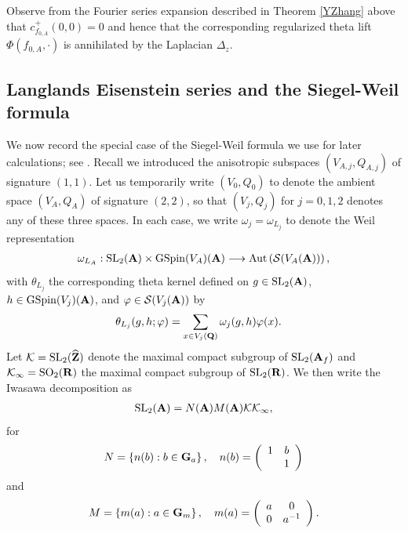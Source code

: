 \documentclass{amsart}
\theoremstyle{definition}
\begin{document}
Observe from the Fourier series expansion described in Theorem \ref{YZhang} above that $c^+_{f_{0, A}}(0,0)=0$
and hence that the corresponding regularized theta lift $\Phi( f_{0, A}, \cdot )$ is annihilated by the Laplacian $\Delta_z$. 

\subsection{Langlands Eisenstein series and the Siegel-Weil formula}

We now record the special case of the Siegel-Weil formula we use for later calculations; see \cite[Theorem 4.1]{KuBL}. 
Recall we introduced the anisotropic subspaces $(V_{A, j}, Q_{A, j})$ of signature $(1,1)$.
Let us temporarily write $(V_0, Q_0)$ to denote the ambient space $(V_A, Q_A)$ of signature $(2, 2)$, so that $(V_j, Q_j)$ for $j=0,1,2$ denotes any of these three spaces. 
In each case, we write $\omega_{j} = \omega_{L_j}$ to denote the Weil representation 
\begin{align*} \omega_{L_A}: \operatorname{SL}_2({\bf{A}}) \times \operatorname{GSpin}(V_A)({\bf{A}}) \longrightarrow \operatorname{Aut} \left(  \mathcal{S}(V_A({\bf{A}})) \right), \end{align*}
with $\theta_{L_j}$ the corresponding theta kernel defined on $g \in \operatorname{SL}_2({\bf{A}})$, 
$h \in \operatorname{GSpin}(V_j)({\bf{A}})$, and $\varphi \in \mathcal{S}(V_j ({\bf{A}}) )$ by 
\begin{align*} \theta_{L_j}(g, h; \varphi) &= \sum\limits_{x \in V_j( {\bf{Q}} ) } \omega_{j}(g, h) \varphi(x). \end{align*}
Let $\mathcal{K} = \operatorname{SL}_2(\widehat{\bf{Z}})$ denote the maximal compact subgroup of $\operatorname{SL}_2({\bf{A}}_f)$
and $\mathcal{K}_{\infty} = \operatorname{SO}_2({\bf{R}})$ the maximal compact subgroup of $\operatorname{SL}_2({\bf{R}})$. 
We then write the Iwasawa decomposition as
\begin{align}\label{Iwasawa} \operatorname{SL}_2({\bf{A}}) = N({\bf{A}}) M({\bf{A}}) \mathcal{K} \mathcal{K}_{\infty}, \end{align} for 
\begin{align*} N = \left\lbrace n(b): b \in {\bf{G}}_a \right\rbrace, \quad n(b) = \left( \begin{array}{cc} 1 & b \\ ~& 1 \end{array} \right) \end{align*}
and \begin{align*} M = \left\lbrace m(a): a \in {\bf{G}}_m \right\rbrace, 
\quad m(a) = \left( \begin{array}{cc} a & 0 \\ 0 & a^{-1}\end{array} \right). \end{align*} 
\end{document}
